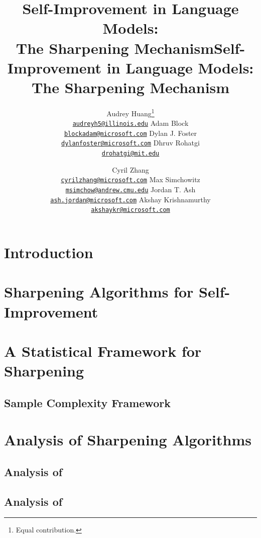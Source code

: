 \documentclass{article}
\title{Self-Improvement in Language Models: \\The Sharpening
  Mechanism}
\title{\huge Self-Improvement in Language Models:\\ The Sharpening
  Mechanism}
\author{
    \begin{tabular}{c c c c}
      \makecell{Audrey Huang\thanks{Equal contribution.} \\
      {\footnotesize\href{mailto:audreyh5@illinois.edu}{\texttt{audreyh5@illinois.edu}}}
      }
      &
              \makecell{Adam Block\footnotemark[1] \\
      {\footnotesize\href{mailto:blockadam@microsoft.com}{\texttt{blockadam@microsoft.com}}}
      }
      &
              \makecell{Dylan J. Foster\footnotemark[1] \\
      {\footnotesize \href{mailto:dylanfoster@microsoft.com}{\texttt{dylanfoster@microsoft.com}}}
      }
      &
        \makecell{Dhruv Rohatgi \\
      {\footnotesize \href{mailto:drohatgi@mit.edu}{\texttt{drohatgi@mit.edu}}}
      }
    \end{tabular}
    \and
        \begin{tabular}{c c c c}
      \makecell{Cyril Zhang \\
      {\footnotesize \href{mailto:cyrilzhang@microsoft.com}{\texttt{cyrilzhang@microsoft.com}}}
      }
      &
              \makecell{Max Simchowitz \\
      {\footnotesize \href{mailto:msimchow@andrew.cmu.edu}{\texttt{msimchow@andrew.cmu.edu}}}
      }
      &
              \makecell{Jordan T. Ash \\
      {\footnotesize \href{mailto:ash.jordan@microsoft.com}{\texttt{ash.jordan@microsoft.com}}}
      }
      &
        \makecell{Akshay Krishnamurthy \\
      {\footnotesize \href{mailto:akshaykr@microsoft.com}{\texttt{akshaykr@microsoft.com}}}
      }
\end{tabular}
  }
\date{}
\newcommand{\arxiv}[1]{\iftoggle{iclr}{}{#1}}
\begin{document}
\maketitle

\begin{abstract}
  
\end{abstract}

\section{Introduction}
\label{sec:intro}




\section{Sharpening Algorithms for Self-Improvement}
\label{sec:algorithms}


\section{A Statistical Framework for Sharpening}
\label{sec:theoretical_framework}

\subsection{Sample Complexity Framework}
\label{sec:sample}


\section{Analysis of Sharpening Algorithms}
\label{sec:theoretical_analysis}


\subsection{Analysis of \bestofnalg}
\label{sec:bestofn_theory}


\subsection{Analysis of \rlhfalg}
\label{sec:rlhf_theory}




\arxiv{
\section{Experiments}
\label{sec:experiments}

}
\end{document}
